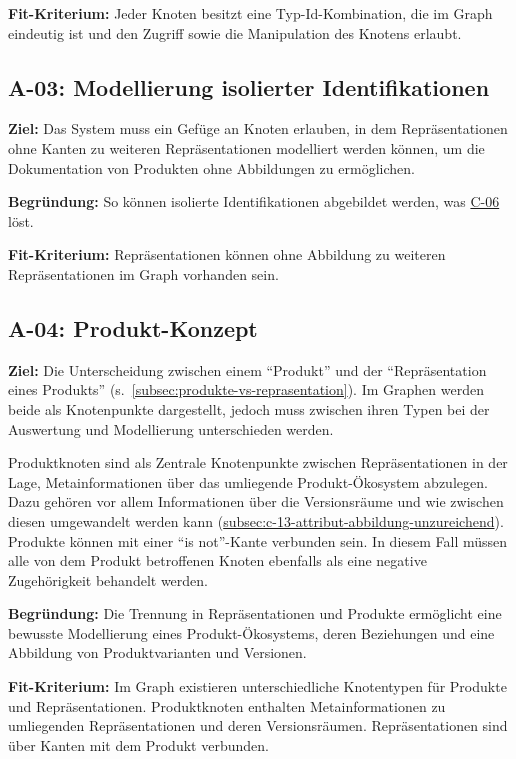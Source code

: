 \textbf{Fit-Kriterium:}
Jeder Knoten besitzt eine Typ-Id-Kombination, die im Graph eindeutig ist und den Zugriff sowie die Manipulation des Knotens erlaubt.

\subsection{A-03: Modellierung isolierter Identifikationen}\label{subsec:req-nodes-without-identification}

\textbf{Ziel:}
Das System muss ein Gefüge an Knoten erlauben, in dem Repräsentationen ohne Kanten zu weiteren Repräsentationen modelliert werden können, um die Dokumentation von Produkten ohne Abbildungen zu ermöglichen.

\textbf{Begründung:}
So können isolierte Identifikationen abgebildet werden, was \hyperref[subsec:c-06-falle-ohne-aktion-konnen-nicht-dokumentiert-werden]{C-06} löst.

\textbf{Fit-Kriterium:}
Repräsentationen können ohne Abbildung zu weiteren Repräsentationen im Graph vorhanden sein.

\subsection{A-04: Produkt-Konzept}\label{subsec:req-product-concept}

\textbf{Ziel:}
Die Unterscheidung zwischen einem \enquote{Produkt} und der \enquote{Repräsentation eines Produkts} (s.\ \autoref{subsec:produkte-vs-reprasentation}).
Im Graphen werden beide als Knotenpunkte dargestellt, jedoch muss zwischen ihren Typen bei der Auswertung und Modellierung unterschieden werden.

Produktknoten sind als Zentrale Knotenpunkte zwischen Repräsentationen in der Lage, Metainformationen über das umliegende Produkt-Ökosystem abzulegen.
Dazu gehören vor allem Informationen über die Versionsräume und wie zwischen diesen umgewandelt werden kann (\hyperref[C-13]{subsec:c-13-attribut-abbildung-unzureichend}).
Produkte können mit einer \enquote{is not}-Kante verbunden sein.
In diesem Fall müssen alle von dem Produkt betroffenen Knoten ebenfalls als eine negative Zugehörigkeit behandelt werden.

\textbf{Begründung:}
Die Trennung in Repräsentationen und Produkte ermöglicht eine bewusste Modellierung eines Produkt-Ökosystems, deren Beziehungen und eine Abbildung von Produktvarianten und Versionen.

\textbf{Fit-Kriterium:}
Im Graph existieren unterschiedliche Knotentypen für Produkte und Repräsentationen.
Produktknoten enthalten Metainformationen zu umliegenden Repräsentationen und deren Versionsräumen.
Repräsentationen sind über Kanten mit dem Produkt verbunden.

